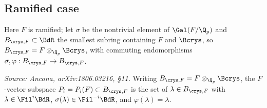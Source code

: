 \subsection*{Ramified case}

Here \(F\) is ramified; let \(\sigma\) be the nontrivial element of
\(\Gal(F/\Q_p)\) and \(B_{\crys,F} \subset \BdR\) the smallest subring
containing \(F\) and \(\Bcrys\), so \(B_{\crys,F} = F \otimes_{\Q_p} \Bcrys\),
with commuting endomorphisms \(\sigma, \varphi : B_{\crys,F} \to B_{\crys,F}\).

\begin{definition}
  \label{def:periods-ram}
  \textit{Source: Ancona, arXiv:1806.03216, \S11.}
  Writing \(B_{\crys,F} = F \otimes_{\Q_p} \Bcrys\), the \(F\)-vector subspace
  \(P_i = P_i(F) \subset B_{\crys,F}\) is the set of \(\lambda \in B_{\crys,F}\)
  with \(\lambda \in \Fil^i \BdR\), \(\sigma(\lambda) \in \Fil^{-i} \BdR\), and
  \(\varphi(\lambda) = \lambda\).
\end{definition}

